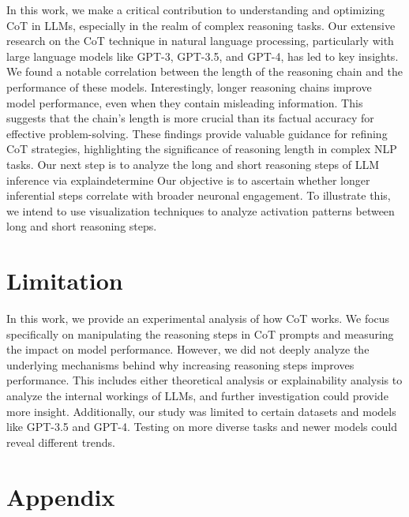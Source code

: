 \documentclass[11pt]{article}
\begin{document}
In this work, we make a critical contribution to understanding and optimizing CoT in LLMs, especially in the realm of complex reasoning tasks. Our extensive research on the CoT technique in natural language processing, particularly with large language models like GPT-3, GPT-3.5, and GPT-4, has led to key insights. We found a notable correlation between the length of the reasoning chain and the performance of these models. Interestingly, longer reasoning chains improve model performance, even when they contain misleading information. This suggests that the chain's length is more crucial than its factual accuracy for effective problem-solving. These findings provide valuable guidance for refining CoT strategies, highlighting the significance of reasoning length in complex NLP tasks.
%
Our next step is to analyze the long and short reasoning steps of LLM inference via explaindetermine%
Our objective is to ascertain whether longer inferential steps correlate with broader neuronal engagement. To illustrate this, we intend to use visualization techniques to analyze activation patterns between long and short reasoning steps.
%

\phantom{Invisible Text}
\vspace{-\baselineskip}

\section{Limitation}

%
In this work, we provide an experimental analysis of how CoT works. We focus specifically on manipulating the reasoning steps in CoT prompts and measuring the impact on model performance. However, we did not deeply analyze the underlying mechanisms behind why increasing reasoning steps improves performance. This includes either theoretical analysis or explainability analysis to analyze the internal workings of LLMs, and further investigation could provide more insight. Additionally, our study was limited to certain datasets and models like GPT-3.5 and GPT-4. Testing on more diverse tasks and newer models could reveal different trends.


\clearpage
\appendix

\onecolumn

\phantom{Invisible Text}
\vspace{-\baselineskip}

\section{Appendix}
\end{document}
